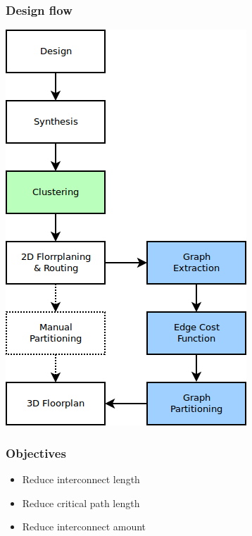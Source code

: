 \documentclass[xcolor={x11names, rgb, usenames, dvipsnames}]{beamer}
\begin{document}
\begin{frame}
  \frametitle{Design flow}
  \centering
  \includegraphics[height=0.85\textheight]{design-flow}
\end{frame}

\begin{frame}
  \frametitle{Objectives}
  \begin{itemize}
    \item Reduce interconnect length
    \item Reduce critical path length
    \item Reduce interconnect amount
  \end{itemize}
\end{frame}
\end{document}
